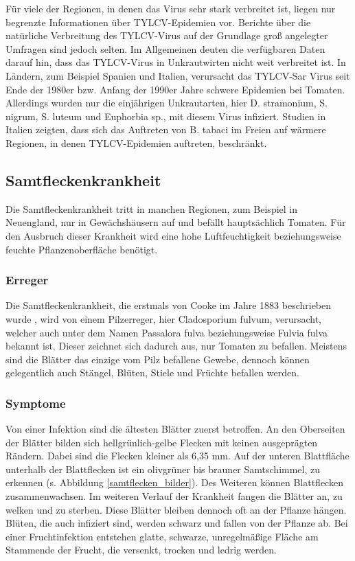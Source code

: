 Für viele der Regionen, in denen das Virus sehr stark verbreitet ist, liegen nur begrenzte Informationen über TYLCV-Epidemien vor. Berichte über die natürliche Verbreitung des TYLCV-Virus auf der Grundlage groß angelegter Umfragen sind jedoch selten. Im Allgemeinen deuten die verfügbaren Daten darauf hin, dass das TYLCV-Virus in Unkrautwirten nicht weit verbreitet ist. In Ländern, zum Beispiel Spanien und Italien, verursacht das TYLCV-Sar Virus seit Ende der 1980er bzw. Anfang der 1990er Jahre schwere Epidemien bei Tomaten. Allerdings wurden nur die einjährigen Unkrautarten, hier D. stramonium, S. nigrum, S. luteum und Euphorbia sp., mit diesem Virus infiziert. Studien in Italien zeigten, dass sich das Auftreten von B. tabaci im Freien auf wärmere Regionen, in denen TYLCV-Epidemien auftreten\cite{TYLCV}, beschränkt. 


\subsection{Samtfleckenkrankheit}

Die Samtfleckenkrankheit tritt in manchen Regionen, zum Beispiel in Neuengland, nur in Gewächshäusern auf und befällt hauptsächlich Tomaten. Für den Ausbruch dieser Krankheit wird eine hohe Luftfeuchtigkeit beziehungsweise feuchte Pflanzenoberfläche benötigt\cite{Greenhouse}.


\subsubsection{Erreger}
Die Samtfleckenkrankheit, die erstmals von Cooke im Jahre 1883 beschrieben wurde \cite{Passalora}, wird von einem Pilzerreger, hier Cladosporium fulvum, verursacht, welcher auch unter dem Namen Passalora fulva beziehungsweise Fulvia fulva bekannt ist\cite{Cladosporium, leaf_mold}. Dieser zeichnet sich dadurch aus, nur Tomaten zu befallen\cite{leaf_mold}. Meistens sind die Blätter das einzige vom Pilz befallene Gewebe, dennoch können gelegentlich auch Stängel, Blüten, Stiele und Früchte befallen werden\cite{Passalora}.


\subsubsection{Symptome}

Von einer Infektion sind die ältesten Blätter zuerst betroffen. An den Oberseiten der Blätter bilden sich hellgrünlich-gelbe Flecken mit keinen ausgeprägten Rändern. Dabei sind die Flecken kleiner als 6,35 mm. Auf der unteren Blattfläche unterhalb der Blattflecken ist ein olivgrüner bis brauner Samtschimmel, zu erkennen (s. Abbildung \ref{samtflecken_bilder}). Des Weiteren können Blattflecken zusammenwachsen. Im weiteren Verlauf der Krankheit fangen die Blätter an, zu welken und zu sterben. Diese Blätter bleiben dennoch oft an der Pflanze hängen. Blüten, die auch infiziert sind, werden schwarz und fallen von der Pflanze ab. Bei einer Fruchtinfektion entstehen glatte, schwarze, unregelmäßige Fläche am Stammende der Frucht, die versenkt, trocken und ledrig werden\cite{Greenhouse, Passalora}. 



